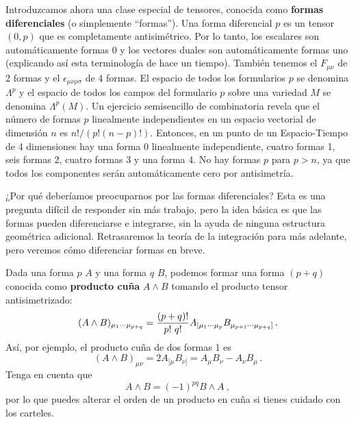 \documentclass[11pt,b5paper,openany,twoside]{book}
\begin{document}
Introduzcamos ahora una clase especial de tensores, conocida como {\bf formas diferenciales} (o simplemente ``formas'').
Una forma diferencial $p$ es un tensor $(0,p)$ que es completamente antisimétrico.
Por lo tanto, los escalares son automáticamente formas 0 y los vectores duales son automáticamente formas uno (explicando así esta terminología de hace un tiempo).
También tenemos el $F_{\mu\nu}$ de 2 formas y el $\epsilon_{\mu\nu\rho\sigma}$ de 4 formas.
El espacio de todos los formularios $p$ se denomina $\Lambda^p$ y el espacio de todos los campos del formulario $p$ sobre una variedad $M$ se denomina $\Lambda^p(M)$.
Un ejercicio semisencillo de combinatoria revela que el número de formas $p$ linealmente independientes en un espacio vectorial de dimensión $n$ es $n!/(p!(n-p)!)$.
Entonces, en un punto de un Espacio-Tiempo de 4 dimensiones hay una forma 0 linealmente independiente, cuatro formas 1, seis formas 2, cuatro formas 3 y una forma 4.
No hay formas $p$ para $p>n$, ya que todos los componentes serán automáticamente cero por antisimetría.

¿Por qué deberíamos preocuparnos por las formas diferenciales? Esta es una pregunta difícil de responder sin más trabajo, pero la idea básica es que las formas pueden diferenciarse e integrarse, sin la ayuda de ninguna estructura geométrica adicional.
Retrasaremos la teoría de la integración para más adelante, pero veremos cómo diferenciar formas en breve.

Dada una forma $p$ $A$ y una forma $q$ $B$, podemos formar una forma $(p+q)$ conocida como {\bf producto cuña} $A\wedge B$ tomando el producto tensor antisimetrizado:
\begin{equation}
(A\wedge B)_{\mu_1 \cdots \mu_{p+q}} = {{(p+q)!}\over{p!\ q!}}
A_{[\mu_1\cdots \mu_p} B_{\mu_{p+1}\cdots\mu_{p+q}]}\,.\label{1.79}
\end{equation}
Así, por ejemplo, el producto cuña de dos formas 1 es
\begin{equation}
(A\wedge B)_{\mu\nu} = 2A_{[\mu}B_{\nu]} = A_\mu B_\nu
- A_\nu B_\mu\,.\label{1.80}
\end{equation}
Tenga en cuenta que
\begin{equation}
A\wedge B = (-1)^{pq} B\wedge A\ ,\label{1.81}
\end{equation}
por lo que puedes alterar el orden de un producto en cuña si tienes cuidado con los carteles.
\end{document}
